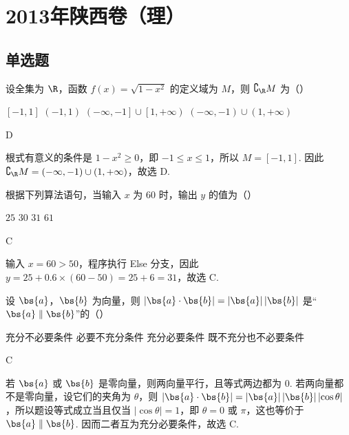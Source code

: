 \chapter{2013年陕西卷（理）}

\section{单选题}

\begin{problem}
设全集为 \(\R\)，函数 \(f(x) = \sqrt{1 - x^2}\) 的定义域为 \(M\)，则 \(\complement_{\R} M\) 为（\quad）

\choices
    {\(\left[-1, 1\right]\)}
    {\(\left(-1, 1\right)\)}
    {\(\left(-\infty, -1\right] \cup \left[1, +\infty\right)\)}
    {\(\left(-\infty, -1\right) \cup \left(1, +\infty\right)\)}

\begin{answer}
D
\end{answer}

\begin{solution}
根式有意义的条件是 \(1-x^2\geqslant0\)，即 \(-1\leqslant x\leqslant1\)，所以 \(M=\left[-1,1\right]\). 因此 \(\complement_{\R}M=\left(-\infty,-1\right)\cup\left(1,+\infty\right)\)，故选 D.
\end{solution}
\end{problem}

\begin{problem}
根据下列算法语句，当输入 \(x\) 为 \(60\) 时，输出 \(y\) 的值为（\quad）


\choices
    {\(25\)}
    {\(30\)}
    {\(31\)}
    {\(61\)}

\begin{answer}
C
\end{answer}

\begin{solution}
输入 \(x=60>50\)，程序执行 Else 分支，因此 \(y=25+0.6\times(60-50)=25+6=31\)，故选 C.
\end{solution}
\end{problem}

\begin{problem}
设 \(\bs{a}\)，\(\bs{b}\) 为向量，则 \(\left|\bs{a}\cdot\bs{b}\right|=\left|\bs{a}\right|\left|\bs{b}\right|\) 是“\(\bs{a}\parallel\bs{b}\)”的（\quad）

\choices
    {充分不必要条件}
    {必要不充分条件}
    {充分必要条件}
    {既不充分也不必要条件}

\begin{answer}
C
\end{answer}

\begin{solution}
若 \(\bs{a}\) 或 \(\bs{b}\) 是零向量，则两向量平行，且等式两边都为 \(0\). 若两向量都不是零向量，设它们的夹角为 \(\theta\)，则 \(\left|\bs{a}\cdot\bs{b}\right|=\left|\bs{a}\right|\left|\bs{b}\right|\left|\cos\theta\right|\)，所以题设等式成立当且仅当 \(\left|\cos\theta\right|=1\)，即 \(\theta=0\) 或 \(\pi\)，这也等价于 \(\bs{a}\parallel\bs{b}\). 因而二者互为充分必要条件，故选 C.
\end{solution}
\end{problem}

